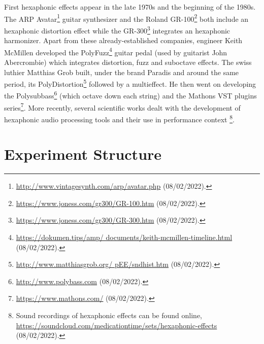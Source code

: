 \documentclass{article}
\begin{document}
First hexaphonic effects appear in the late 1970s and the beginning of the 1980s. The ARP Avatar\footnote{\url{http://www.vintagesynth.com/arp/avatar.php} (08/02/2022).} guitar synthesizer and the Roland GR-100\footnote{\url{https://www.joness.com/gr300/GR-100.htm} (08/02/2022).} both include an hexaphonic distortion effect while the GR-300\footnote{\url{https://www.joness.com/gr300/GR-300.htm} (08/02/2022).} integrates an hexaphonic harmonizer. Apart from these already-established companies, engineer Keith McMillen developed the PolyFuzz\footnote{\url{https://dokumen.tips/amp/
documents/keith-mcmillen-timeline.html} (08/02/2022).} guitar pedal (used by guitarist John Abercrombie) which integrates distortion, fuzz and suboctave effects. The swiss luthier Matthias Grob built, under the brand Paradis and around the same period, its PolyDistortion\footnote{\url{http://www.matthiasgrob.org/
pEE/sndhist.htm} (08/02/2022).} followed by a multieffect. He then went on developing the Polysubbass\footnote{\url{http://www.polybass.com} (08/02/2022).} (which octave down each string) and the Mathons VST plugins series\footnote{\url{https://www.mathons.com/} (08/02/2022).}.
More recently, several scientific works dealt with the development of hexaphonic audio processing tools \cite{sci:Puckette2007} and their use in performance context \cite{Reboursiere2020_Puzzle_eng,sci:Graham2012, Bates2009}\footnote{Sound recordings of hexaphonic effects can be found online, \url{https://soundcloud.com/medicationtime/sets/hexaphonic-effects} (08/02/2022).}.



\section{Experiment Structure}\label{sec:exp_structure}
\end{document}
